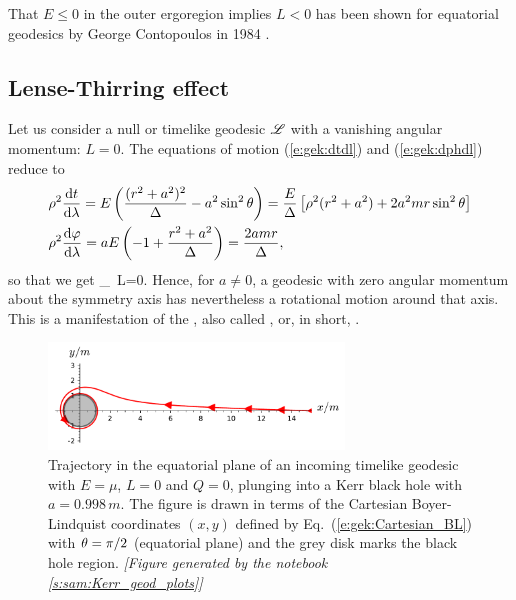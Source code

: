 \begin{hist}
That $E \leq 0$ in the outer ergoregion implies $L<0$ has been shown for
equatorial geodesics by George Contopoulos in 1984 \cite{Conto84}.
\end{hist}



\subsection{Lense-Thirring effect} \label{s:gek:Lense-Thirring}

Let us consider a null or timelike geodesic $\mathscr{L}$ with a vanishing angular
momentum: $L=0$. The equations of motion (\ref{e:gek:dtdl}) and (\ref{e:gek:dphdl})
reduce to
\begin{align}
& \rho^2 \frac{\mathrm{d} t}{\mathrm{d} \lambda} = E \left( \frac{(r^2 + a^2)^2}{\Delta}   - a^2 \sin^2\theta \right)
= \frac{E}{\Delta} \left[ \rho^2(r^2 + a^2) + 2 a^2 m r \sin^2\theta \right] \nonumber \\
& \rho^2 \frac{\mathrm{d} \varphi}{\mathrm{d} \lambda}  = a E \left( - 1 + \frac{r^2 + a^2}{\Delta} \right)
 = \frac{2 a m r}{\Delta} , \nonumber
\end{align}
so that we get
\be \label{e:gek:dphdt_frame_dragging}
     _{\ L=0}.
\ee
Hence, for $a\neq 0$, a geodesic with zero angular momentum about the
symmetry axis has nevertheless a rotational motion around that axis.
This is a manifestation of the ,
also called , or, in short, .

\begin{figure}
\centerline{\includegraphics[width=0.7\textwidth]{gek_frame_dragging.pdf}}
\caption[]{\label{f:gek:frame_dragging} \footnotesize
Trajectory in the equatorial plane of an incoming timelike geodesic with
$E = \mu$, $L=0$ and $Q=0$, plunging into a Kerr black hole with $a = 0.998 \, m$.
The figure is drawn in terms
of the Cartesian Boyer-Lindquist coordinates $(x,y)$ defined by
Eq.~(\ref{e:gek:Cartesian_BL}) with $\theta=\pi/2$ (equatorial plane)
and the grey disk marks the black hole region.
\textsl{[Figure generated by the notebook \ref{s:sam:Kerr_geod_plots}]}
}
\end{figure}

